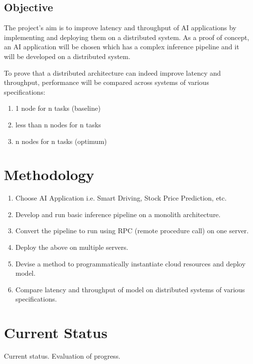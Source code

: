 \documentclass{report}
\begin{document}
\section{Objective}
The project's aim is to improve latency and throughput of AI applications by implementing and deploying them on a distributed system. As a proof of concept, an AI application will be chosen which has a complex inference pipeline and it will be developed on a distributed system.

To prove that a distributed architecture can indeed improve latency and throughput, performance will be compared across systems of various specifications:
\begin{enumerate}
  \item 1 node for n tasks (baseline)
  \item less than n nodes for n tasks
  \item n nodes for n tasks (optimum)
\end{enumerate}

\chapter{Methodology}
\begin{enumerate}
  \item Choose AI Application i.e. Smart Driving, Stock Price Prediction, etc.
  \item Develop and run basic inference pipeline on a monolith architecture.
  \item Convert the pipeline to run using RPC (remote procedure call) on one server.
  \item Deploy the above on multiple servers.
  \item Devise a method to programmatically instantiate cloud resources and deploy model.
  \item Compare latency and throughput of model on distributed systems of various specifications.
\end{enumerate}

\chapter{Current Status}
Current status. Evaluation of progress.
\end{document}
